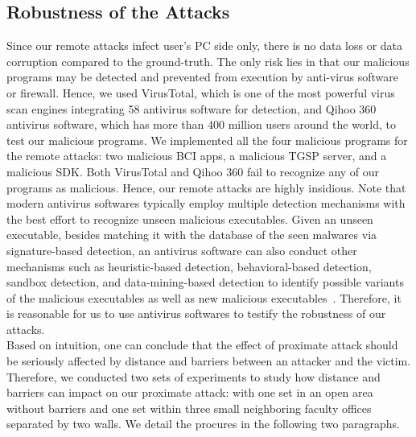 \subsection{Robustness of the Attacks}
Since our remote attacks infect user's PC side only, there is no data loss or data corruption compared to the ground-truth. The only risk lies in that our malicious programs may be detected and prevented from execution by anti-virus software or firewall. Hence, we used VirusTotal, which is one of the most powerful virus scan engines integrating 58 antivirus software for detection, and Qihoo 360 antivirus software, which has more than 400 million users around the world, to test our malicious programs. We implemented all the four malicious programs for the remote attacks: two malicious BCI apps, a malicious TGSP server, and a malicious SDK. Both VirusTotal and Qihoo 360 fail to recognize any of our programs as malicious. Hence, our remote attacks are highly insidious. Note that modern antivirus softwares typically employ multiple detection mechanisms with the best effort to recognize unseen malicious executables. Given an unseen executable, besides matching it with the database of the seen malwares via signature-based detection, an antivirus software can also conduct other mechanisms such as heuristic-based detection,  behavioral-based detection, sandbox detection, and data-mining-based detection to identify possible variants of the malicious executables as well as new malicious executables~\cite{antivirusintro}. Therefore, it is reasonable for us to use antivirus softwares to testify the robustness of our attacks.\\
%
\indent Based on intuition, one can conclude that the effect of proximate attack should be seriously affected by distance and barriers between an attacker and the victim. Therefore, we conducted two sets of experiments to study how distance and barriers can impact on our proximate attack: with one set in an open area without barriers and one set within three small neighboring faculty offices separated by two walls. We detail the procures in the following two paragraphs.\\
%
\indent
